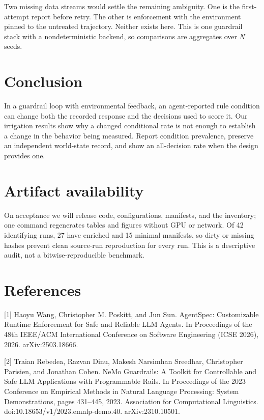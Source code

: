 \documentclass{article}
\begin{document}
Two missing data streams would settle the remaining ambiguity. One is the first-attempt report before retry. The other is enforcement with the environment pinned to the untreated trajectory. Neither exists here. This is one guardrail stack with a nondeterministic backend, so comparisons are aggregates over \textit{N} seeds.

\section{Conclusion}
In a guardrail loop with environmental feedback, an agent-reported rule condition can change both the recorded response and the decisions used to score it. Our irrigation results show why a changed conditional rate is not enough to establish a change in the behavior being measured. Report condition prevalence, preserve an independent world-state record, and show an all-decision rate when the design provides one.

\section*{Artifact availability}
On acceptance we will release code, configurations, manifests, and the inventory; one command regenerates tables and figures without GPU or network. Of 42 identifying runs, 27 have enriched and 15 minimal manifests, so dirty or missing hashes prevent clean source-run reproduction for every run. This is a descriptive audit, not a bitwise-reproducible benchmark.

\section*{References}

[1] Haoyu Wang, Christopher M. Poskitt, and Jun Sun. AgentSpec: Customizable Runtime Enforcement for Safe and Reliable LLM Agents. In Proceedings of the 48th IEEE/ACM International Conference on Software Engineering (ICSE 2026), 2026. arXiv:2503.18666.

[2] Traian Rebedea, Razvan Dinu, Makesh Narsimhan Sreedhar, Christopher Parisien, and Jonathan Cohen. NeMo Guardrails: A Toolkit for Controllable and Safe LLM Applications with Programmable Rails. In Proceedings of the 2023 Conference on Empirical Methods in Natural Language Processing: System Demonstrations, pages 431--445, 2023. Association for Computational Linguistics. doi:10.18653/v1/2023.emnlp-demo.40. arXiv:2310.10501.
\end{document}

